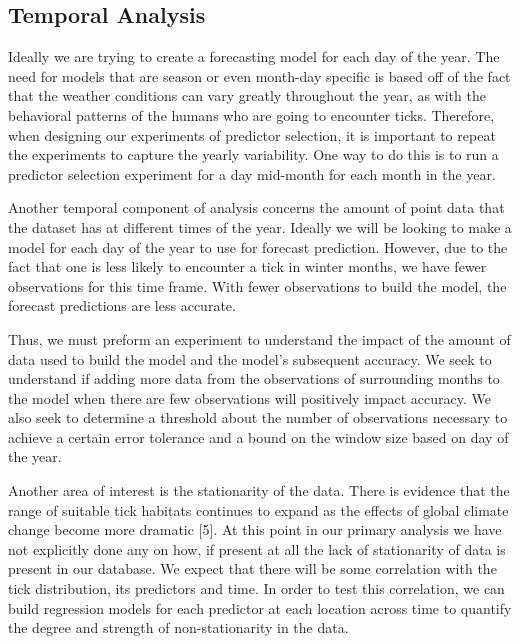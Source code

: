 \subsection{Temporal Analysis}
Ideally we are trying to create a forecasting model for each day of the year. The need for models that are season or even month-day specific is based off of the fact that the weather conditions can vary greatly throughout the year, as with the behavioral patterns of the humans who are going to encounter ticks. Therefore, when designing our experiments of predictor selection, it is important to repeat the experiments to capture the yearly variability. One way to do this is to run a predictor selection experiment for a day mid-month for each month in the year. \newline

\noindent Another temporal component of analysis concerns the amount of point data that the dataset has at different times of the year. Ideally we will be looking to make a model for each day of the year to use for forecast prediction. However, due to the fact that one is less likely to encounter a tick in winter months, we have fewer observations for this time frame. With fewer observations to build the model, the forecast predictions are less accurate. \newline 

\noindent Thus, we must preform an experiment to understand the impact of the amount of data used to build the model and the model's subsequent accuracy. We seek to understand if adding more data from the observations of surrounding months to the model when there are few observations will positively impact accuracy. We also seek to determine a threshold about the number of observations necessary to achieve a certain error tolerance and a bound on the window size based on day of the year. \newline

\noindent Another area of interest is the stationarity of the data. There is evidence that the range of suitable tick habitats continues to expand as the effects of global climate change become more dramatic [5]. At this point in our primary analysis we have not explicitly done any on how, if present at all the lack of stationarity of data is present in our database. We expect that there will be some correlation with the tick distribution, its predictors and time. In order to test this correlation, we can build regression models for each predictor at each location across time to quantify the degree and strength of non-stationarity in the data.  \newline


